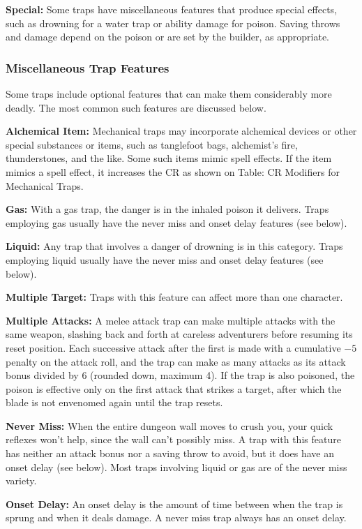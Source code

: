 \textbf{Special:} Some traps have miscellaneous features that produce special effects, such as drowning for a water trap or ability damage for poison. Saving throws and damage depend on the poison or are set by the builder, as appropriate.

\subsubsection{Miscellaneous Trap Features}
Some traps include optional features that can make them considerably more deadly. The most common such features are discussed below.

\textbf{Alchemical Item:} Mechanical traps may incorporate alchemical devices or other special substances or items, such as tanglefoot bags, alchemist's fire, thunderstones, and the like. Some such items mimic spell effects. If the item mimics a spell effect, it increases the CR as shown on Table: CR Modifiers for Mechanical Traps.

\textbf{Gas:} With a gas trap, the danger is in the inhaled poison it delivers. Traps employing gas usually have the never miss and onset delay features (see below).

\textbf{Liquid:} Any trap that involves a danger of drowning is in this category. Traps employing liquid usually have the never miss and onset delay features (see below).

\textbf{Multiple Target:} Traps with this feature can affect more than one character.

\textbf{Multiple Attacks:} A melee attack trap can make multiple attacks with the same weapon, slashing back and forth at careless adventurers before resuming its reset position. Each successive attack after the first is made with a cumulative $-5$ penalty on the attack roll, and the trap can make as many attacks as its attack bonus divided by 6 (rounded down, maximum 4). If the trap is also poisoned, the poison is effective only on the first attack that strikes a target, after which the blade is not envenomed again until the trap resets.

\textbf{Never Miss:} When the entire dungeon wall moves to crush you, your quick reflexes won't help, since the wall can't possibly miss. A trap with this feature has neither an attack bonus nor a saving throw to avoid, but it does have an onset delay (see below). Most traps involving liquid or gas are of the never miss variety.

\textbf{Onset Delay:} An onset delay is the amount of time between when the trap is sprung and when it deals damage. A never miss trap always has an onset delay.

